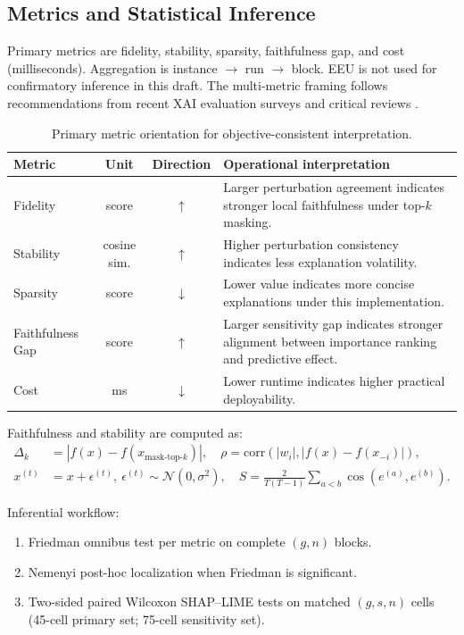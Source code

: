 \documentclass[twoside,11pt]{article}
\begin{document}
\subsection{Metrics and Statistical Inference}
\label{sec:methods-inference}
Primary metrics are fidelity, stability, sparsity, faithfulness gap, and cost
(milliseconds). Aggregation is instance $\rightarrow$ run $\rightarrow$ block.
EEU is not used for confirmatory inference in this draft. The multi-metric
framing follows recommendations from recent XAI evaluation surveys and critical
reviews \citep{kadir2023metrics,pawlicki2024multiple,adadi2018xai,arrieta2020xai}.
\begin{table}[t]
\centering
\caption{Primary metric orientation for objective-consistent interpretation.}
\begin{tabularx}{\linewidth}{l c c X}
\toprule
\textbf{Metric} & \textbf{Unit} & \textbf{Direction} & \textbf{Operational interpretation} \\
\midrule
Fidelity & score & $\uparrow$ & Larger perturbation agreement indicates stronger local faithfulness under top-$k$ masking. \\
Stability & cosine sim. & $\uparrow$ & Higher perturbation consistency indicates less explanation volatility. \\
Sparsity & score & $\downarrow$ & Lower value indicates more concise explanations under this implementation. \\
Faithfulness Gap & score & $\uparrow$ & Larger sensitivity gap indicates stronger alignment between importance ranking and predictive effect. \\
Cost & ms & $\downarrow$ & Lower runtime indicates higher practical deployability. \\
\bottomrule
\end{tabularx}
\label{tab:metric-orientation}
\end{table}

Faithfulness and stability are computed as:
\begin{align}
\Delta_k &= \left|f(x)-f\left(x_{\text{mask-top-}k}\right)\right|,\quad
\rho = \mathrm{corr}\left(|w_i|,\left|f(x)-f(x_{-i})\right|\right),\\
x^{(t)} &= x + \epsilon^{(t)},\ \epsilon^{(t)}\sim\mathcal{N}(0,\sigma^2),\quad
S = \frac{2}{T(T-1)}\sum_{a<b}\cos\left(e^{(a)},e^{(b)}\right).
\end{align}

Inferential workflow:
\begin{enumerate}[leftmargin=*]
    \item Friedman omnibus test per metric on complete $(g,n)$ blocks.
    \item Nemenyi post-hoc localization when Friedman is significant.
    \item Two-sided paired Wilcoxon SHAP--LIME tests on matched
    $(g,s,n)$ cells (45-cell primary set; 75-cell sensitivity set).
\end{enumerate}
\end{document}
